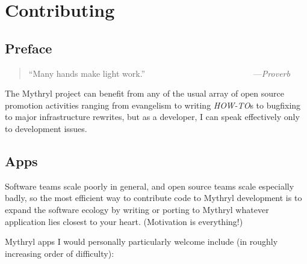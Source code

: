 \chapter{Contributing}

%
%

\section{Preface}

\begin{quote}\begin{tiny}
           ``Many hands make light work.''\newline
            ~~~~~~~~~~~~~~~~~~~~~~~~~---{\em Proverb}
\end{tiny}\end{quote}

The Mythryl project can benefit from any of the usual array of 
open source promotion activities ranging from evangelism to 
writing {\em HOW-TO}s to bugfixing to major infrastructure rewrites, 
but as a developer, I can speak effectively only to development issues.

\section{Apps}

Software teams scale poorly in general, and open source teams 
scale especially badly, so the most efficient way to contribute 
code to Mythryl development is to expand the software ecology 
by writing or porting to Mythryl whatever application 
lies closest to your heart.  (Motivation is everything!)

Mythryl apps I would personally particularly welcome include 
(in roughly increasing order of difficulty):

